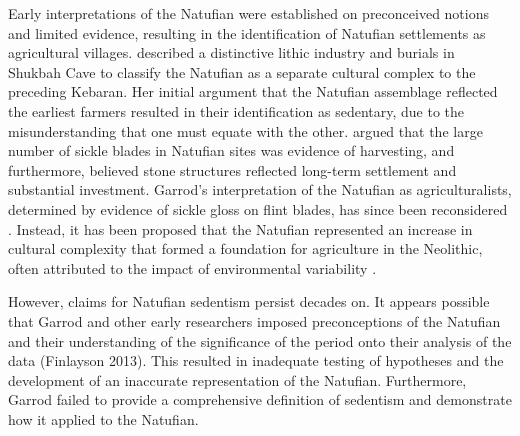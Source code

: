 \documentclass[%
	]{ijsra}
\begin{document}
Early interpretations of the Natufian were established on preconceived notions and limited evidence, resulting in the identification of Natufian settlements as agricultural villages. \textcite{Garrod_1957} described a distinctive lithic industry and burials in Shukbah Cave to classify the Natufian as a separate cultural complex to the preceding Kebaran. Her initial argument that the Natufian assemblage reflected the earliest farmers resulted in their identification as sedentary, due to the misunderstanding that one must equate with the other. 
\textcite{Garrod_1957} argued that the large number of sickle blades in Natufian sites was evidence of harvesting, and furthermore, believed stone structures reflected long-term settlement and substantial investment. 
Garrod’s interpretation of the Natufian as agriculturalists, determined by evidence of sickle gloss on flint blades, has since been reconsidered \parencite[75]{Lieberman_1999}. 
Instead, it has been proposed that the Natufian represented an increase in cultural complexity that formed a foundation for agriculture in the Neolithic, often attributed to the impact of environmental variability \parencite[447]{Bar-Yosef_1989}. 

However, claims for Natufian sedentism persist decades on. It appears possible that Garrod and other early researchers imposed preconceptions of the Natufian and their understanding of the significance of the period onto their analysis of the data (Finlayson 2013). %
This resulted in inadequate testing of hypotheses and the development of an inaccurate representation of the Natufian. Furthermore, Garrod failed to provide a comprehensive definition of sedentism and demonstrate how it applied to the Natufian.


\end{document}
